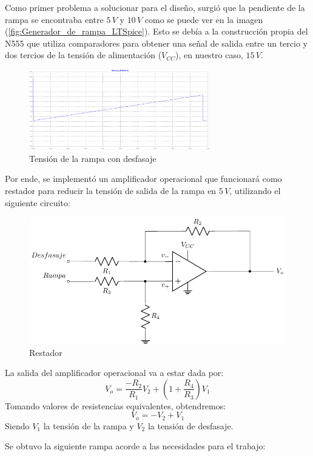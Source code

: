 Como primer problema a solucionar para el diseño, surgió que la pendiente de la rampa se encontraba entre $5\,V$ y $10\,V$ como se puede ver en la imagen (\ref{fig:Generador_de_rampa_LTSpice}). Esto se debía a la construcción propia del N555 que utiliza comparadores para obtener una señal de salida entre un tercio y dos tercios de la tensión de alimentación ($V_{CC}$), en nuestro caso, $15\,V$.


\begin{figure}[H]
\centering
\includegraphics[width=0.7\textwidth]{Ejercicio8/Imagenes/Rampa_desfasada}
\caption{Tensión de la rampa con desfasaje}
\label{fig:Generador_de_rampa_desfasada_LTSpice}
\end{figure}

Por ende, se implementó un amplificador operacional que funcionará como restador para reducir la tensión de salida de la rampa en $5\,V$, utilizando el siguiente circuito:

\begin{figure}[H]
\centering
\includegraphics[scale=0.8]{Ejercicio8/Circuitos/Restador.pdf}
\caption{Restador}
\label{fig:Restador}
\end{figure}
La salida del amplificador operacional va a estar dada por:
\begin{equation}
V_o=\frac{-R_2}{R_1}V_2+\left(1+\frac{R_4}{R_3}\right)V_1
\end{equation}
Tomando valores de resistencias equivalentes, obtendremos:
\begin{equation}
V_o=-V_2+V_1
\end{equation}
Siendo $V_1$ la tensión de la rampa y $V_2$ la tensión de desfasaje.\par\par
Se obtuvo la siguiente rampa acorde a las necesidades para el trabajo:

